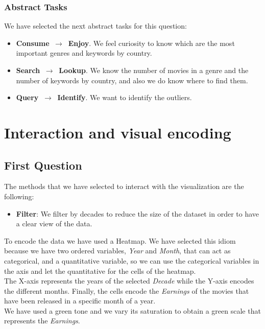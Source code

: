 \subsubsection{Abstract Tasks}

We have selected the next abstract tasks for this question:

\begin{itemize}
	\item \textbf{Consume $\,\to\,$ Enjoy}. We feel curiosity to know which are the most important genres and keywords by country.
	\item \textbf{Search $\,\to\,$ Lookup}. We know the number of movies in a genre and the number of keywords by country, and also we do know where to find them.
	\item \textbf{Query $\,\to\,$ Identify}. We want to identify the outliers.
\end{itemize}

\section{Interaction and visual encoding}

\subsection{First Question}

The methods that we have selected to interact with the visualization are the following:

\begin{itemize}
	\item \textbf{Filter}: We filter by decades to reduce the size of the dataset in order to have a clear view of the data.
\end{itemize}

To encode the data we have used a Heatmap. We have selected this idiom because we have two ordered variables, \textit{Year} and \textit{Month}, that can act as categorical, and a quantitative variable, so we can use the categorical variables in the axis and let the quantitative for the cells of the heatmap.\\

The X-axis represents the years of the selected \textit{Decade} while the Y-axis encodes the different months. Finally, the cells encode the \textit{Earnings} of the movies that have been released in a specific month of a year.\\

We have used a green tone and we vary its saturation to obtain a green scale that represents the \textit{Earnings}.\\

